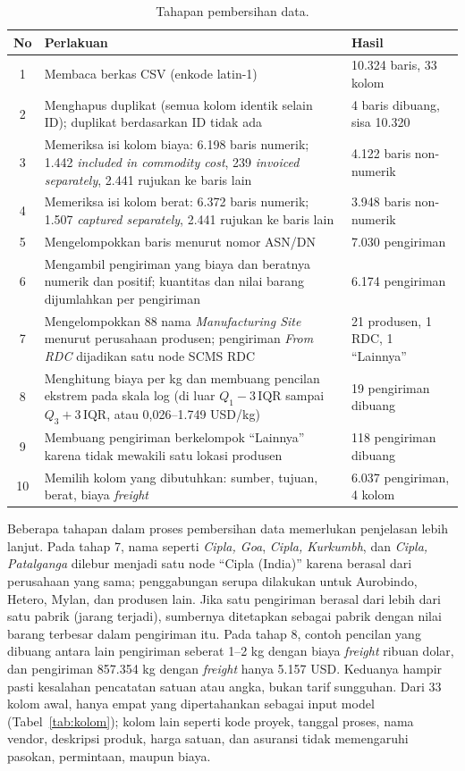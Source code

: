 \documentclass[a4paper,11pt]{article}
\begin{document}
\begin{table}[htbp]
\centering
\caption{Tahapan pembersihan data.}\label{tab:bersih}
\small
\begin{tabular}{@{}c p{8cm} p{4.3cm}@{}}
\toprule
No & Perlakuan & Hasil \\
\midrule
1 & Membaca berkas CSV (enkode latin-1) & 10.324 baris, 33 kolom \\
2 & Menghapus duplikat (semua kolom identik selain ID); duplikat berdasarkan ID tidak ada & 4 baris dibuang, sisa 10.320 \\
3 & Memeriksa isi kolom biaya: 6.198 baris numerik; 1.442 \textit{included in commodity cost}, 239 \textit{invoiced separately}, 2.441 rujukan ke baris lain & 4.122 baris non-numerik \\
4 & Memeriksa isi kolom berat: 6.372 baris numerik; 1.507 \textit{captured separately}, 2.441 rujukan ke baris lain & 3.948 baris non-numerik \\
5 & Mengelompokkan baris menurut nomor ASN/DN & 7.030 pengiriman \\
6 & Mengambil pengiriman yang biaya dan beratnya numerik dan positif; kuantitas dan nilai barang dijumlahkan per pengiriman & 6.174 pengiriman \\
7 & Mengelompokkan 88 nama \textit{Manufacturing Site} menurut perusahaan produsen; pengiriman \textit{From RDC} dijadikan satu node SCMS RDC & 21 produsen, 1 RDC, 1 ``Lainnya'' \\
8 & Menghitung biaya per kg dan membuang pencilan ekstrem pada skala log (di luar $Q_1-3\,\mathrm{IQR}$ sampai $Q_3+3\,\mathrm{IQR}$, atau 0,026--1.749 USD/kg) & 19 pengiriman dibuang \\
9 & Membuang pengiriman berkelompok ``Lainnya'' karena tidak mewakili satu lokasi produsen & 118 pengiriman dibuang \\
10 & Memilih kolom yang dibutuhkan: sumber, tujuan, berat, biaya \textit{freight} & 6.037 pengiriman, 4 kolom \\
\bottomrule
\end{tabular}
\end{table}

Beberapa tahapan dalam proses pembersihan data memerlukan penjelasan lebih lanjut. Pada tahap 7, nama seperti \textit{Cipla, Goa}, \textit{Cipla, Kurkumbh}, dan \textit{Cipla, Patalganga} dilebur menjadi satu node ``Cipla (India)'' karena berasal dari perusahaan yang sama; penggabungan serupa dilakukan untuk Aurobindo, Hetero, Mylan, dan produsen lain. Jika satu pengiriman berasal dari lebih dari satu pabrik (jarang terjadi), sumbernya ditetapkan sebagai pabrik dengan nilai barang terbesar dalam pengiriman itu. Pada tahap 8, contoh pencilan yang dibuang antara lain pengiriman seberat 1--2 kg dengan biaya \textit{freight} ribuan dolar, dan pengiriman 857.354 kg dengan \textit{freight} hanya 5.157 USD. Keduanya hampir pasti kesalahan pencatatan satuan atau angka, bukan tarif sungguhan. Dari 33 kolom awal, hanya empat yang dipertahankan sebagai input model (Tabel~\ref{tab:kolom}); kolom lain seperti kode proyek, tanggal proses, nama vendor, deskripsi produk, harga satuan, dan asuransi tidak memengaruhi pasokan, permintaan, maupun biaya.
\end{document}
